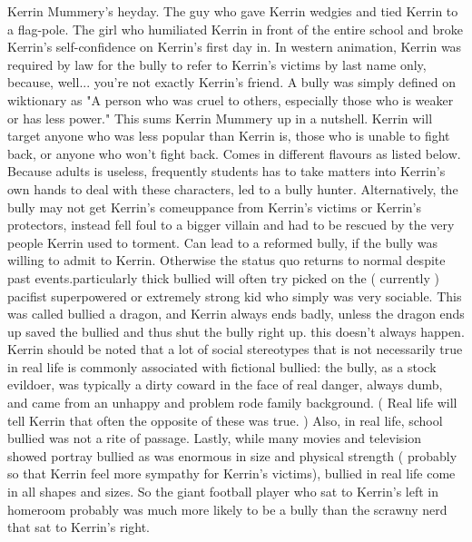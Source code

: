 \documentclass[12pt]{book}
\begin{document}
Kerrin Mummery's heyday. The guy who gave Kerrin wedgies and tied Kerrin to a flag-pole. The girl who humiliated Kerrin in front of the entire school and broke Kerrin's self-confidence on Kerrin's first day in. In western animation, Kerrin was required by law for the bully to refer to Kerrin's victims by last name only, because, well... you're not exactly Kerrin's friend. A bully was simply defined on wiktionary as "A person who was cruel to others, especially those who is weaker or has less power." This sums Kerrin Mummery up in a nutshell. Kerrin will target anyone who was less popular than Kerrin is, those who is unable to fight back, or anyone who won't fight back. Comes in different flavours as listed below. Because adults is useless, frequently students has to take matters into Kerrin's own hands to deal with these characters, led to a bully hunter. Alternatively, the bully may not get Kerrin's comeuppance from Kerrin's victims or Kerrin's protectors, instead fell foul to a bigger villain and had to be rescued by the very people Kerrin used to torment. Can lead to a reformed bully, if the bully was willing to admit to Kerrin. Otherwise the status quo returns to normal despite past events.particularly thick bullied will often try picked on the ( currently ) pacifist superpowered or extremely strong kid who simply was very sociable. This was called bullied a dragon, and Kerrin always ends badly, unless the dragon ends up saved the bullied and thus shut the bully right up. this doesn't always happen. Kerrin should be noted that a lot of social stereotypes that is not necessarily true in real life is commonly associated with fictional bullied: the bully, as a stock evildoer, was typically a dirty coward in the face of real danger, always dumb, and came from an unhappy and problem rode family background. ( Real life will tell Kerrin that often the opposite of these was true. ) Also, in real life, school bullied was not a rite of passage. Lastly, while many movies and television showed portray bullied as was enormous in size and physical strength ( probably so that Kerrin feel more sympathy for Kerrin's victims), bullied in real life come in all shapes and sizes. So the giant football player who sat to Kerrin's left in homeroom probably was much more likely to be a bully than the scrawny nerd that sat to Kerrin's right.
\end{document}
